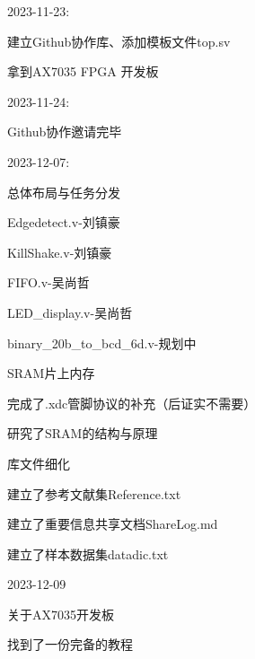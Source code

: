 %

\ifx\allfiles\undefined

\else
\fi


\begin{compactitem}
	\item 2023-11-23:
	\begin{compactitem}
		\item 建立Github协作库、添加模板文件top.sv
		\item 拿到AX7035 FPGA 开发板
	\end{compactitem}
	\item 2023-11-24:
	\begin{compactitem}
		\item Github协作邀请完毕
	\end{compactitem}
	\item 2023-12-07:
	\begin{compactitem}
		\item 总体布局与任务分发
		\begin{compactitem}
			\item Edgedetect.v-刘镇豪
			\item KillShake.v-刘镇豪
			\item FIFO.v-吴尚哲
			\item LED\_display.v-吴尚哲
			\item binary\_20b\_to\_bcd\_6d.v-规划中
		\end{compactitem}
		\item SRAM片上内存
		\begin{compactitem}
			\item 完成了.xdc管脚协议的补充（后证实不需要）
			\item 研究了SRAM的结构与原理
		\end{compactitem}
		\item 库文件细化
		\begin{compactitem}
			\item 建立了参考文献集Reference.txt
			\item 建立了重要信息共享文档ShareLog.md
			\item 建立了样本数据集datadic.txt
		\end{compactitem}
\end{compactitem}
	\item 2023-12-09 
	\begin{compactitem}
		\item 关于AX7035开发板
		\begin{compactitem}
			\item 找到了一份完备的教程

\end{compactitem}
\end{compactitem}
\end{compactitem}
